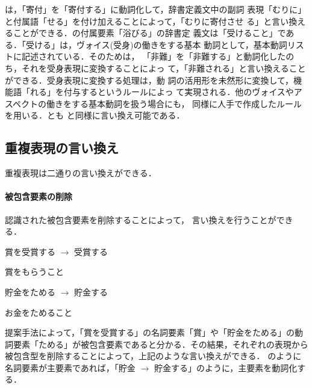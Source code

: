 \documentclass{nlp}
\begin{document}
は，「寄付」を「寄付する」に動詞化して，辞書定義文中の副詞
表現「むりに」と付属語「せる」を付け加えることによって，「むりに寄付させ
る」と言い換えることができる．の付属要素「浴びる」の辞書定
義文は「受けること」である．「受ける」は，ヴォイス(受身)の働きをする基本
動詞として，基本動詞リストに記述されている．そのためは，
「非難」を「非難する」と動詞化したのち，それを受身表現に変換することによっ
て，「非難される」と言い換えることができる．受身表現に変換する処理は，動
詞の活用形を未然形に変換して，機能語「れる」を付与するというルールによっ
て実現される．他のヴォイスやアスペクトの働きをする基本動詞を扱う場合にも，
同様に人手で作成したルールを用いる．とも
と同様に言い換え可能である．


\subsection{重複表現の言い換え}
重複表現は二通りの言い換えができる．

\paragraph{被包含要素の削除} 認識された被包含要素を削除することによって，
言い換えを行うことができる．
\begin{EXAMPLE}
 \item 賞を受賞する $\rightarrow$ 受賞する 

 \hspace{10pt}{\bf 受賞} \hspace{10pt}賞をもらうこと

 \item 貯金をためる $\rightarrow$ 貯金する 

 \hspace{10pt}{\bf 貯金} \hspace{10pt}お金をためること
\end{EXAMPLE}
提案手法によって，「賞を受賞する」の名詞要素「賞」や「貯金をためる」の動
詞要素「ためる」が被包含要素であると分かる．その結果，それぞれの表現から
被包含型を削除することによって，上記のような言い換えができる．
のように名詞要素が主要素であれば，「貯金
$\rightarrow$ 貯金する」のように，主要素を動詞化する．
\end{document}
